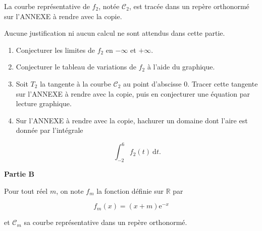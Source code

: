 \documentclass[10pt,a4paper]{article}
\newcommand{\R}{\mathbb{R}}
\begin{document}
La courbe représentative de $f_2$, notée $\mathcal{C}_2$, est tracée dans un repère orthonormé sur l'ANNEXE à rendre avec la copie.

\medskip

Aucune justification ni aucun calcul ne sont attendus dans cette partie.

\medskip

\begin{enumerate}
\item Conjecturer les limites de $f_2$ en $- \infty$ et $+ \infty$.
\item Conjecturer le tableau de variations de $f_2$ à l'aide du graphique.
\item Soit $T_2$ la tangente à la courbe $\mathcal{C}_2$ au point d'abscisse $0$. Tracer cette tangente sur l'ANNEXE à rendre avec la copie, puis en conjecturer une équation par lecture
graphique.
\item Sur l'ANNEXE à rendre avec la copie, hachurer un domaine dont l'aire est donnée
par l'intégrale

\[\displaystyle\int_{-2}^6 f_2(t)\:\text{d}t.\]

\end{enumerate}

\bigskip

\textbf{Partie B}

\medskip

Pour tout réel $m$, on note $f_m$ la fonction définie sur $\R$ par 

\[f_m(x) = (x + m)\text{e}^{- x}\]

et $\mathcal{C}_m$ sa courbe représentative dans un repère orthonormé.

\medskip
\end{document}
